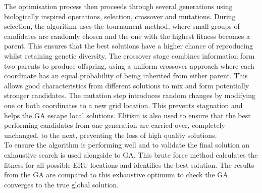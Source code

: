 \documentclass[12pt,a4paper]{article}
\begin{document}
The optimisation process then proceeds through several generations using biologically inspired operations, selection, crossover and mutations. During selection, the algorithm uses the tournament method, where small groups of candidates are randomly chosen and the one with the highest fitness becomes a parent. This ensures that the best solutions have a higher chance of reproducing whilst retaining genetic diversity. The crossover stage combines information form two parents to produce offspring, using a uniform crossover approach where each coordinate has an equal probability of being inherited from either parent. This allows good characteristics from different solutions to mix and form potentially stronger candidates. The mutation step introduces random changes by modifying one or both coordinates to a new grid location. This prevents stagnation and helps the GA escape local solutions. Elitism is also used to ensure that the best performing candidates from one generation are carried over, completely unchanged, to the next, preventing the loss of high quality solutions.\\

To ensure the algorithm is performing well and to validate the final solution an exhaustive search is used alongside to GA. This brute force method calculates the fitness for all possible ERU locations and identifies the best solution. The results from the GA are compared to this exhaustive optimum to check the GA converges to the true global solution.
\end{document}
